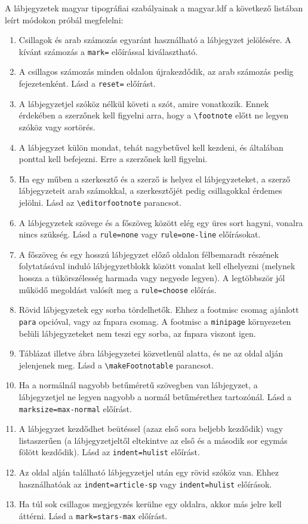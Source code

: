 \documentclass[12pt]{article}
\begin{document}
A lábjegyzetek magyar tipográfiai szabályainak a \textsf{magyar.ldf} a következő listában leírt módokon próbál megfelelni:

\begin{enumerate}
\item
Csillagok és arab számozás egyaránt használható a lábjegyzet jelölésére.
A kívánt számozás a \texttt{mark=} előírással kiválasztható.
\item
A csillagos számozás minden oldalon újrakezdődik, az arab számozás pedig fejezetenként.
Lásd a \texttt{reset=} előírást.
\item
A lábjegyzetjel szóköz nélkül követi a szót, amire vonatkozik.
Ennek érdekében a szerzőnek kell figyelni arra, hogy a \verb|\footnote| előtt ne legyen szóköz vagy sortörés.
\item
A lábjegyzet külön mondat, tehát nagybetűvel kell kezdeni, és általában ponttal kell befejezni.
Erre a szerzőnek kell figyelni.
\item
Ha egy műben a szerkesztő és a szerző is helyez el lábjegyzeteket, a szerző lábjegyzeteit arab számokkal, a szerkesztőjét pedig csillagokkal érdemes jelölni. Lásd az \verb|\editorfootnote| parancsot.
\item
A lábjegyzetek szövege és a főszöveg között elég egy üres sort hagyni, vonalra nincs
szükség.
Lásd a \texttt{rule=none} vagy \texttt{rule=one-line} előírásokat.
\item
A főszöveg és egy hosszú lábjegyzet előző oldalon félbemaradt részének folytatásával induló lábjegyzetblokk között vonalat kell elhelyezni (melynek hossza a tükörszélesség harmada vagy negyede legyen).
A legtöbbször jól működő megoldást valósít meg a \texttt{rule=choose} előírás.
\item
Rövid lábjegyzetek egy sorba tördelhetők.
Ehhez a \textsf{footmisc} csomag ajánlott \texttt{para} opcióval, vagy az \textsf{fnpara} csomag. 
A \textsf{footmisc} a \texttt{minipage} környezeten belüli lábjegyzeteket nem teszi egy sorba, az \textsf{fnpara} viszont igen.
\item
Táblázat illetve ábra lábjegyzetei közvetlenül alatta, és ne az oldal alján jelenjenek meg.
Lásd a \verb|\makeFootnotable| parancsot.
\item
Ha a normálnál nagyobb betűméretű szövegben van lábjegyzet, a lábjegyzetjel ne legyen nagyobb a normál betűmérethez tartozónál.
Lásd a \texttt{marksize=max-normal} előírást.
\item
A lábjegyzet kezdődhet beütéssel (azaz első sora beljebb kezdődik) vagy listaszerűen (a lábjegyzetjeltől eltekintve az első és a második sor egymás fölött kezdődik).
Lásd az \texttt{indent=hulist} előírást.
\item
Az oldal alján található lábjegyzetjel után egy rövid szóköz van.
Ehhez használhatóak az \texttt{indent=article-sp} vagy \texttt{indent=hulist} előírások.
\item
Ha túl sok csillagos megjegyzés kerülne egy oldalra, akkor más jelre kell áttérni.
Lásd a \texttt{mark=stars-max} előírást.
\end{enumerate}
\end{document}

